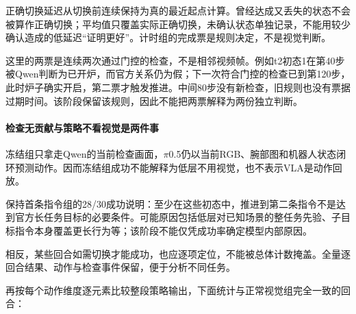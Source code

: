 正确切换延迟从切换前连续保持为真的最近起点计算。曾经达成又丢失的状态不会被算作正确切换；平均值只覆盖实际正确切换，未确认状态单独记录，不能用较少确认造成的低延迟``证明更好''。计时组的完成票是规则决定，不是视觉判断。

这里的两票是连续两次通过门控的检查，不是相邻视频帧。例如t2初态1在第40步被Qwen判断为已开炉，而官方关系仍为假；下一次符合门控的检查已到第120步，此时炉子确实开启，第二票才触发推进。中间80步没有新检查，旧规则也没有票据过期时间。该阶段保留该规则，因此不能把两票解释为两份独立判断。


\paragraph{检查无贡献与策略不看视觉是两件事}\label{s12-detail-13}

冻结组只拿走Qwen的当前检查画面，\(\pi\)0.5仍以当前RGB、腕部图和机器人状态闭环预测动作。因而冻结组成功不能解释为低层不用视觉，也不表示VLA是动作回放。

保持首条指令组的28/30成功说明：至少在这些初态中，推进到第二条指令不是达到官方长任务目标的必要条件。可能原因包括低层对已知场景的整任务先验、子目标指令本身覆盖更长行为等；该阶段不能仅凭成功率确定模型内部原因。

相反，某些回合如需切换才能成功，也应逐项定位，不能被总体计数掩盖。全量逐回合结果、动作与检查事件保留，便于分析不同任务。

再按每个动作维度逐元素比较整段策略输出，下面统计与正常视觉组完全一致的回合：

